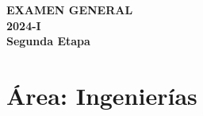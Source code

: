 \newpage
\mbox{}               %
\newpage

\thispagestyle{empty}

\vspace*{\fill}
\begin{center}
	{\Huge\bfseries EXAMEN GENERAL }\\[10pt]
	{\Huge\bfseries 2024-I}\\[10pt]
	{\Large\bfseries Segunda Etapa}
\end{center}
\vspace*{\fill}

\clearpage

\section*{Área: Ingenierías}




